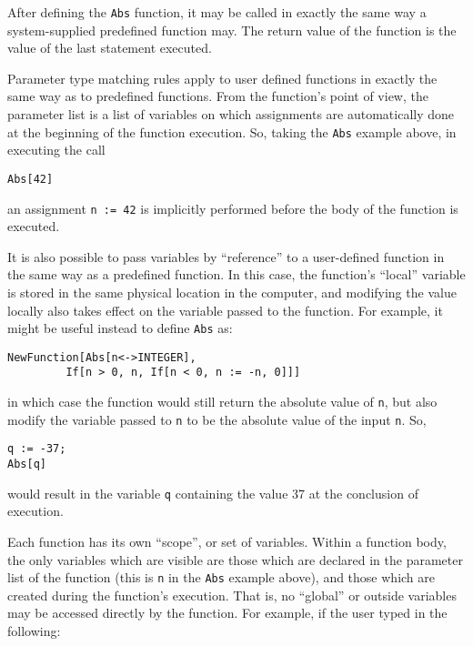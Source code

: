 \noindent After defining the \verb+Abs+ function, it may be called in
exactly the same way a system-supplied predefined function may.  The
return value of the function is the value of the last statement
executed.

Parameter type matching rules apply to user defined functions in
exactly the same way as to predefined functions.  From the function's
point of view, the parameter list is a list of variables on which
assignments are automatically done at the beginning of the function
execution.  So, taking the \verb+Abs+ example above, in executing the
call

\begin{verbatim}
Abs[42]
\end{verbatim}

\noindent an assignment \verb+n := 42+ is implicitly performed before
the body of the function is executed.

It is also possible to pass variables by ``reference'' to a
user-defined function in the same way as a predefined function.  In
this case, the function's ``local'' variable is stored in the same
physical location in the computer, and modifying the value locally
also takes effect on the variable passed to the function.  For
example, it might be useful instead to define \verb+Abs+ as:

\begin{verbatim}
NewFunction[Abs[n<->INTEGER],
		 If[n > 0, n, If[n < 0, n := -n, 0]]]
\end{verbatim}

\noindent in which case the function would still return the absolute
value of \verb+n+, but also modify the variable passed to \verb+n+ to
be the absolute value of the input \verb+n+.  So,

\begin{verbatim}
q := -37;
Abs[q]
\end{verbatim}

\noindent would result in the variable \verb+q+ containing the value
37 at the conclusion of execution.

Each function has its own ``scope'', or set of variables.  Within a
function body, the only variables which are visible are those which
are declared in the parameter list of the function (this is \verb+n+
in the \verb+Abs+ example above), and those which are created during
the function's execution.  That is, no ``global'' or outside variables
may be accessed directly by the function.  For example, if the user
typed in the following:

